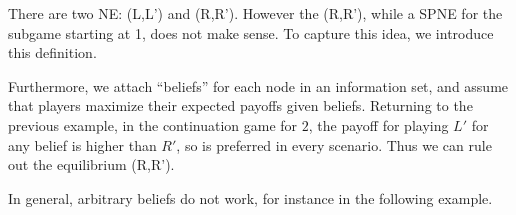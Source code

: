 \begin{aexample}{}{}
    \begin{center}
    \end{center}
\end{aexample}
There are two NE: (L,L') and (R,R'). However the (R,R'), while a SPNE for the subgame starting at 1, does not make sense.
To capture this idea, we introduce this definition.

Furthermore, we attach ``beliefs'' for each node in an information set, and assume that players maximize their expected payoffs given beliefs.
Returning to the previous example, in the continuation game for $2$, the payoff for playing $L'$ for any belief is higher than $R'$, so is preferred in every scenario. Thus we can rule out the equilibrium (R,R').


In general, arbitrary beliefs do not work, for instance in the following example.

